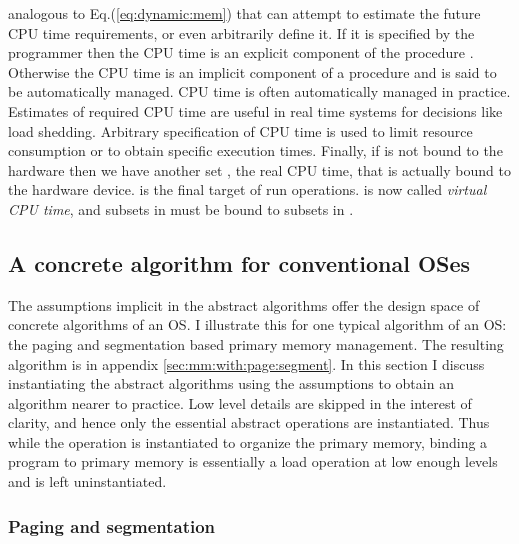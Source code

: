 \documentclass[draft]{article}
\begin{document}
analogous  to Eq.(\ref{eq:dynamic:mem}) that  can attempt  to estimate
the future CPU  time requirements, or even arbitrarily  define it.  If
it is  specified by the  programmer then the  CPU time is  an explicit
component  of the  procedure  .   Otherwise the  CPU  time is  an
implicit  component of  a procedure  and is  said to  be automatically
managed.   CPU  time  is  often  automatically  managed  in  practice.
Estimates of  required CPU  time are useful  in real time  systems for
decisions like load shedding.   Arbitrary specification of CPU time is
used  to limit resource  consumption or  to obtain  specific execution
times.  Finally,  if   is not  bound to the  hardware then  we have
another set ,  the real CPU time, that  is actually bound to
the  hardware  device.     is  the  final  target  of  run
operations.   is now called \emph{virtual CPU time}, and subsets in
 must be bound to subsets in .

\subsection{A concrete algorithm for conventional OSes}
\label{sec:concrete:algos}

The assumptions  implicit in the abstract algorithms  offer the design
space  of concrete algorithms  of an  OS.  I  illustrate this  for one
typical algorithm of an OS:  the paging and segmentation based primary
memory   management.    The  resulting   algorithm   is  in   appendix
\ref{sec:mm:with:page:segment}.     In   this   section    I   discuss
instantiating the abstract algorithms  using the assumptions to obtain
an algorithm nearer to practice.  Low level details are skipped in the
interest of clarity, and  hence only the essential abstract operations
are instantiated.   Thus while the  operation  is instantiated to
organize the  primary memory, binding  a program to primary  memory is
essentially  a  load  operation  at  low enough  levels  and  is  left
uninstantiated.

\subsubsection{Paging and segmentation}
\label{sec:concrete:paging:seg}
\end{document}
